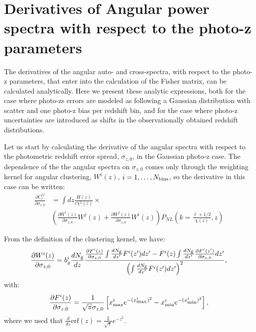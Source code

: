 \documentclass[a4paper,fleqn,usenatbib]{mnras}
\begin{document}
\section{Derivatives of Angular power spectra with respect to the photo-z parameters}

The derivatives of the angular auto- and cross-spectra, with respect to the photo-z parameters, that enter into the calculation of the Fisher matrix, can be calculated analytically. 
Here we present these analytic expressions, both for the case where photo-zs errors are modeled as following a Gaussian distribution with scatter and one photo-z bias per redshift bin, and for the case where photo-z uncertainties are introduced as shifts in the observationally obtained redshift distributions.

Let us start by calculating the derivative of the angular spectra with respect to the photometric redshift error spread, $\sigma_{z,0}$, in the Gaussian photo-z case. The dependence of the the angular spectra on $\sigma_{z,0}$ comes only through the weighting kernel for angular clustering, $W^i(z)$, $i = 1, \dots,  N_{\mbox{\scriptsize{bins}}}$, so the derivative in this case can be written:
\begin{align}
\frac{\partial C_\ell^{ij}}{\partial \sigma_{z,0}}  &=  \int  dz \frac{H(z)}{c\chi^2(z)} \times \nonumber \\   
 & \left(\frac{\partial W^i(z)}{\partial \sigma_{z,0}} W^j(z) +
 \frac{\partial W^j(z)}{\partial \sigma_{z,0}} W^i(z)  \right)P_{NL}\left(k=\frac{\ell+1/2}{\chi(z)},z \right) 
\end{align}

From the definition of the clustering kernel, we have:
\begin{equation}
\frac{\partial W^i(z)}{\partial \sigma_{z,0}} =b_g^i\frac{dN_{\mbox{\scriptsize{g}}} }{dz}\frac{\frac{\partial F^i(z)}{\partial \sigma_{z,0}}\int \frac{dN_{\mbox{\scriptsize{g}}} }{dz'}F^i(z')dz' -F^i(z)\int \frac{dN_{\mbox{\scriptsize{g}}} }{dz'} \frac{\partial F^i(z')}{\partial \sigma_{z,0} }dz'}{\left(\int \frac{dN_{\mbox{\scriptsize{g}}} }{dz'}F^i(z')dz' \right)^2},
\end{equation}
with:
\begin{equation}
\frac{\partial  F^i(z)}{\partial \sigma_{z,0}} = \frac{1}{\sqrt{\pi}\sigma_{z,0}}\left[ x_{\mbox{\scriptsize{max}}}^i e^{- (x_{\mbox{\scriptsize{max}}}^i)^2}  -  x_{\mbox{\scriptsize{min}}}^i e^{- (x_{\mbox{\scriptsize{min}}}^i)^2} \right],
\end{equation}
where we used that $\frac{d}{dz} \mbox{erf}(z) =  \frac{2}{\sqrt{\pi}} e^{-z^2}$.
\end{document}
